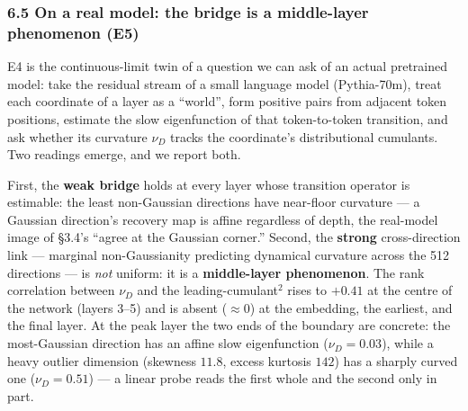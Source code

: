\documentclass[
  letterpaper,
  11pt]{article}
\theoremstyle{plain}
\theoremstyle{definition}
\theoremstyle{remark}
\begin{document}
\subsubsection{6.5 On a real model: the bridge is a middle-layer phenomenon (E5)}\label{on-a-real-model-the-bridge-is-a-middle-layer-phenomenon-e5}

E4 is the continuous-limit twin of a question we can ask of an actual pretrained model: take the residual stream of a small language model (Pythia-70m), treat each coordinate of a layer as a ``world'', form positive pairs from adjacent token positions, estimate the slow eigenfunction of that token-to-token transition, and ask whether its curvature \(\nu_D\) tracks the coordinate's distributional cumulants. Two readings emerge, and we report both.

First, the \textbf{weak bridge} holds at every layer whose transition operator is estimable: the least non-Gaussian directions have near-floor curvature --- a Gaussian direction's recovery map is affine regardless of depth, the real-model image of §3.4's ``agree at the Gaussian corner.'' Second, the \textbf{strong} cross-direction link --- marginal non-Gaussianity predicting dynamical curvature across the 512 directions --- is \emph{not} uniform: it is a \textbf{middle-layer phenomenon}. The rank correlation between \(\nu_D\) and the leading-cumulant\(^2\) rises to \(+0.41\) at the centre of the network (layers 3--5) and is absent (\(\approx 0\)) at the embedding, the earliest, and the final layer. At the peak layer the two ends of the boundary are concrete: the most-Gaussian direction has an affine slow eigenfunction (\(\nu_D=0.03\)), while a heavy outlier dimension (skewness \(11.8\), excess kurtosis \(142\)) has a sharply curved one (\(\nu_D=0.51\)) --- a linear probe reads the first whole and the second only in part.
\end{document}
